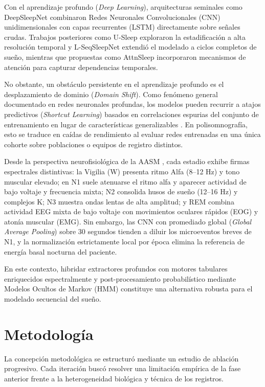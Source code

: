 \documentclass[conference]{IEEEtran}
\begin{document}
Con el aprendizaje profundo (\textit{Deep Learning}), arquitecturas seminales como DeepSleepNet \cite{supratak2017} combinaron Redes Neuronales Convolucionales (CNN) unidimensionales con capas recurrentes (LSTM) directamente sobre señales crudas. Trabajos posteriores como U-Sleep \cite{perslev2021} exploraron la estadificación a alta resolución temporal y L-SeqSleepNet \cite{phan2023} extendió el modelado a ciclos completos de sueño, mientras que propuestas como AttnSleep \cite{eldele2021} incorporaron mecanismos de atención para capturar dependencias temporales.

No obstante, un obstáculo persistente en el aprendizaje profundo es el desplazamiento de dominio (\textit{Domain Shift}). Como fenómeno general documentado en redes neuronales profundas, los modelos pueden recurrir a atajos predictivos (\textit{Shortcut Learning}) basados en correlaciones espurias del conjunto de entrenamiento en lugar de características generalizables \cite{geirhos2020shortcut}. En polisomnografía, esto se traduce en caídas de rendimiento al evaluar redes entrenadas en una única cohorte sobre poblaciones o equipos de registro distintos.

Desde la perspectiva neurofisiológica de la AASM \cite{berry2020}, cada estadio exhibe firmas espectrales distintivas: la Vigilia (W) presenta ritmo Alfa (8--12 Hz) y tono muscular elevado; en N1 suele atenuarse el ritmo alfa y aparecer actividad de bajo voltaje y frecuencia mixta; N2 consolida husos de sueño (12--16 Hz) y complejos K; N3 muestra ondas lentas de alta amplitud; y REM combina actividad EEG mixta de bajo voltaje con movimientos oculares rápidos (EOG) y atonía muscular (EMG). Sin embargo, las CNN con promediado global (\textit{Global Average Pooling}) sobre 30 segundos tienden a diluir los microeventos breves de N1, y la normalización estrictamente local por época elimina la referencia de energía basal nocturna del paciente.

En este contexto, hibridar extractores profundos con motores tabulares enriquecidos espectralmente y post-procesamiento probabilístico mediante Modelos Ocultos de Markov (HMM) constituye una alternativa robusta para el modelado secuencial del sueño.

\section{Metodología}
La concepción metodológica se estructuró mediante un estudio de ablación progresivo. Cada iteración buscó resolver una limitación empírica de la fase anterior frente a la heterogeneidad biológica y técnica de los registros.
\end{document}
